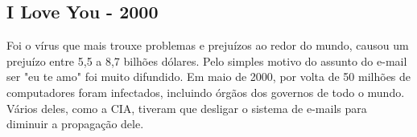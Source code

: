 \subsection{I Love You - 2000}	
	Foi o vírus que mais trouxe problemas e prejuízos ao redor do mundo, causou um prejuízo entre 5,5 a 8,7 bilhões dólares.  Pelo simples motivo do assunto do e-mail ser "eu te amo" foi muito difundido. Em maio de 2000, por volta de 50 milhões de computadores foram infectados, incluindo órgãos dos governos de todo o mundo. Vários deles, como a CIA, tiveram que desligar o sistema de e-mails para diminuir a propagação dele.